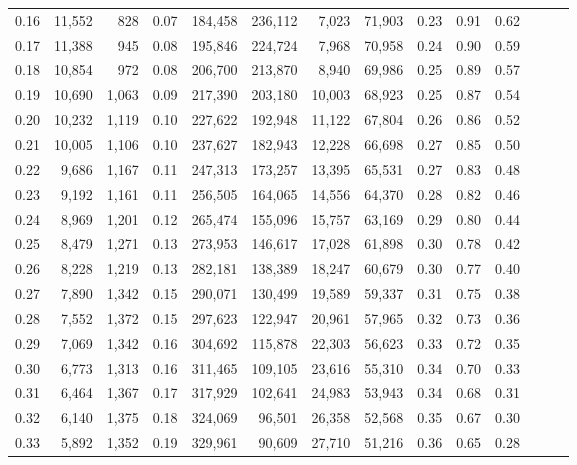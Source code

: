 \begin{tabular}{rrrrrrrrrrrrrr}
0.16 &  11,552 &    828 &  0.07 &  184,458 &  236,112 &   7,023 &  71,903 &  0.23 &  0.91 &      0.62 \\
0.17 &  11,388 &    945 &  0.08 &  195,846 &  224,724 &   7,968 &  70,958 &  0.24 &  0.90 &      0.59 \\
0.18 &  10,854 &    972 &  0.08 &  206,700 &  213,870 &   8,940 &  69,986 &  0.25 &  0.89 &      0.57 \\
0.19 &  10,690 &  1,063 &  0.09 &  217,390 &  203,180 &  10,003 &  68,923 &  0.25 &  0.87 &      0.54 \\
0.20 &  10,232 &  1,119 &  0.10 &  227,622 &  192,948 &  11,122 &  67,804 &  0.26 &  0.86 &      0.52 \\
0.21 &  10,005 &  1,106 &  0.10 &  237,627 &  182,943 &  12,228 &  66,698 &  0.27 &  0.85 &      0.50 \\
0.22 &   9,686 &  1,167 &  0.11 &  247,313 &  173,257 &  13,395 &  65,531 &  0.27 &  0.83 &      0.48 \\
0.23 &   9,192 &  1,161 &  0.11 &  256,505 &  164,065 &  14,556 &  64,370 &  0.28 &  0.82 &      0.46 \\
0.24 &   8,969 &  1,201 &  0.12 &  265,474 &  155,096 &  15,757 &  63,169 &  0.29 &  0.80 &      0.44 \\
0.25 &   8,479 &  1,271 &  0.13 &  273,953 &  146,617 &  17,028 &  61,898 &  0.30 &  0.78 &      0.42 \\
0.26 &   8,228 &  1,219 &  0.13 &  282,181 &  138,389 &  18,247 &  60,679 &  0.30 &  0.77 &      0.40 \\
0.27 &   7,890 &  1,342 &  0.15 &  290,071 &  130,499 &  19,589 &  59,337 &  0.31 &  0.75 &      0.38 \\
0.28 &   7,552 &  1,372 &  0.15 &  297,623 &  122,947 &  20,961 &  57,965 &  0.32 &  0.73 &      0.36 \\
0.29 &   7,069 &  1,342 &  0.16 &  304,692 &  115,878 &  22,303 &  56,623 &  0.33 &  0.72 &      0.35 \\
0.30 &   6,773 &  1,313 &  0.16 &  311,465 &  109,105 &  23,616 &  55,310 &  0.34 &  0.70 &      0.33 \\
0.31 &   6,464 &  1,367 &  0.17 &  317,929 &  102,641 &  24,983 &  53,943 &  0.34 &  0.68 &      0.31 \\
0.32 &   6,140 &  1,375 &  0.18 &  324,069 &   96,501 &  26,358 &  52,568 &  0.35 &  0.67 &      0.30 \\
0.33 &   5,892 &  1,352 &  0.19 &  329,961 &   90,609 &  27,710 &  51,216 &  0.36 &  0.65 &      0.28 \\

\end{tabular}

